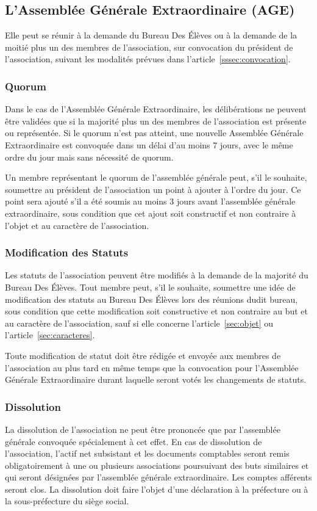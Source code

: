 \documentclass{article}
\begin{document}
		\subsection{L’Assemblée Générale Extraordinaire (AGE)}
			Elle peut se réunir à la demande du Bureau Des Élèves ou à la demande de
			la moitié plus un des membres de l’association, sur convocation du
			président de l’association, suivant les modalités prévues dans
			l’article~\ref{sssec:convocation}.

			\subsubsection{Quorum}
				Dans le cas de l’Assemblée Générale Extraordinaire, les délibérations
				ne peuvent être validées que si la majorité plus un
				des membres de l’association est présente ou représentée. Si le
				quorum n’est pas atteint, une nouvelle Assemblée Générale
				Extraordinaire
				est convoquée dans un délai d’au moins 7 jours, avec le même ordre du
				jour mais sans nécessité de quorum.

				Un membre représentant le quorum de l’assemblée générale peut, s’il
				le souhaite, soumettre au président de l’association un point à
				ajouter à l’ordre du jour. Ce point sera ajouté s’il a été
				soumis au moins 3 jours avant l’assemblée générale
				extraordinaire, sous condition que cet ajout soit constructif et
				non contraire à l'objet et au caractère de l’association.

			\subsubsection{Modification des Statuts}
				Les statuts de l’association peuvent être modifiés à la demande de la
				majorité du Bureau Des Élèves. Tout membre peut, s’il le souhaite,
				soumettre une idée de modification des statuts au Bureau Des Élèves
				lors des réunions dudit bureau, sous condition que cette modification
				soit constructive et non contraire au but et au caractère de
				l’association, sauf si elle concerne l'article~\ref{sec:objet}
				ou l'article~\ref{sec:caracteres}.

				Toute modification de statut doit être rédigée et envoyée aux membres
				de l’association au plus tard en même temps que la convocation pour
				l’Assemblée Générale Extraordinaire durant laquelle seront votés les
				changements de statuts.

			\subsubsection{Dissolution}
				La dissolution de l’association ne peut être prononcée que par
				l’assemblée générale convoquée spécialement à cet effet.
				En cas de dissolution de l’association, l’actif net subsistant et les
				documents comptables seront remis obligatoirement à une ou plusieurs
				associations poursuivant des buts similaires et qui seront désignées
				par l’assemblée générale extraordinaire. Les comptes afférents seront
				clos.
				La dissolution doit faire l’objet d’une déclaration à la préfecture
				ou à la sous-préfecture du siège social.
\end{document}
